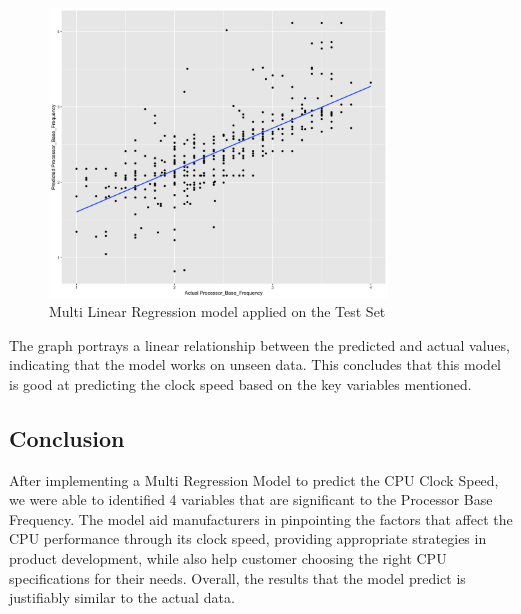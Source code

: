 \begin{figure}[H]
    \centering
    \includegraphics[width=0.8\textwidth]{graphics/test_set_graph.png}
    \caption{Multi Linear Regression model applied on the Test Set}
\end{figure}

The graph portrays a linear relationship between the predicted and actual values, indicating that the model works on unseen data. This concludes that this model is good at predicting the clock speed based on the key variables mentioned.

\subsection{Conclusion}
After implementing a Multi Regression Model to predict the CPU Clock Speed, we were able to identified 4 variables that are significant to the Processor Base Frequency. The model aid manufacturers in pinpointing the factors that affect the CPU performance through its clock speed, providing appropriate strategies in product development, while also help customer choosing the right CPU specifications for their needs. Overall, the results that the model predict is justifiably similar to the actual data. 
\newpage
